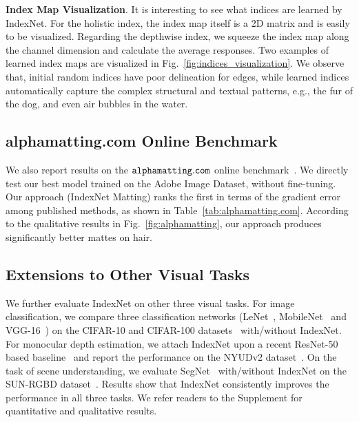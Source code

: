 \documentclass[10pt,twocolumn,letterpaper]{article}
\begin{document}
\vspace{3pt}
\noindent\textbf{Index Map Visualization}. It is interesting to see what indices are learned by IndexNet. For the holistic index, the index map itself is a 2D matrix and is easily to be visualized. Regarding the depthwise index, we squeeze the index map along the channel dimension and calculate the average responses. Two examples of learned index maps are visualized in Fig.~\ref{fig:indices_visualization}. We observe that, initial random indices have poor delineation for edges, while learned indices automatically capture the complex structural and textual patterns, e.g., the fur of the dog, and even air bubbles in the water.

\subsection{alphamatting.com Online Benchmark}

We also report results on the $ \tt alphamatting.com $ online benchmark~\cite{rhemann2009perceptually}. We directly test our best model trained on the Adobe Image Dataset, without fine-tuning. Our approach (IndexNet Matting) ranks the first in terms of the gradient error among published methods, as shown in Table~\ref{tab:alphamatting.com}. According to the qualitative results in Fig.~\ref{fig:alphamatting}, our approach produces significantly better mattes on hair.



\subsection{Extensions to Other Visual Tasks}

We further evaluate IndexNet on other three visual tasks. For image classification, we compare three classification networks (LeNet~\cite{lecun1998gradient}, MobileNet~\cite{howard2017mobilenets} and VGG-16~\cite{simonyan2014very}) on the CIFAR-10 and CIFAR-100 datasets~\cite{krizhevsky2009learning} with/without IndexNet. For monocular depth estimation, we attach IndexNet upon a recent ResNet-50 based baseline~\cite{hu2019revisiting} and report the performance on the NYUDv2 dataset~\cite{silberman2012indoor}. On the task of scene understanding, we evaluate SegNet~\cite{badrinarayanan2017segnet} with/without IndexNet on the SUN-RGBD dataset~\cite{song2015sun}. Results show that IndexNet consistently improves the performance in all three tasks. We refer readers to the Supplement for quantitative and qualitative results.
\end{document}
